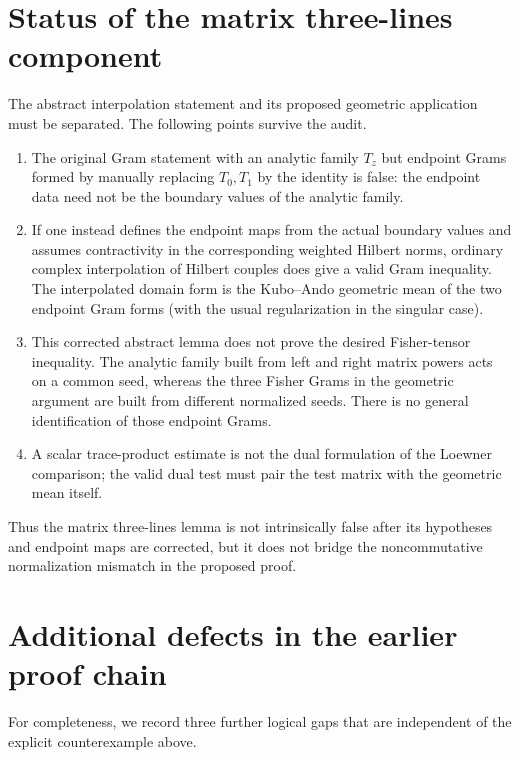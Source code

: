 \documentclass[11pt]{article}
\theoremstyle{definition}
\begin{document}
\section{Status of the matrix three-lines component}

The abstract interpolation statement and its proposed geometric application must be separated.
The following points survive the audit.

\begin{enumerate}[label=\textup{(\roman*)},leftmargin=2.1em]
\item The original Gram statement with an analytic family $T_z$ but endpoint Grams formed by
      manually replacing $T_0,T_1$ by the identity is false: the endpoint data need not be the
      boundary values of the analytic family.
\item If one instead defines the endpoint maps from the actual boundary values and assumes
      contractivity in the corresponding weighted Hilbert norms, ordinary complex interpolation
      of Hilbert couples does give a valid Gram inequality.  The interpolated domain form is the
      Kubo--Ando geometric mean of the two endpoint Gram forms (with the usual regularization in
      the singular case).
\item This corrected abstract lemma does not prove the desired Fisher-tensor inequality.  The
      analytic family built from left and right matrix powers acts on a common seed, whereas the
      three Fisher Grams in the geometric argument are built from different normalized seeds.
      There is no general identification of those endpoint Grams.
\item A scalar trace-product estimate is not the dual formulation of the Loewner comparison; the
      valid dual test must pair the test matrix with the geometric mean itself.
\end{enumerate}

Thus the matrix three-lines lemma is not intrinsically false after its hypotheses and endpoint maps
are corrected, but it does not bridge the noncommutative normalization mismatch in the proposed
proof.

\section{Additional defects in the earlier proof chain}

For completeness, we record three further logical gaps that are independent of the explicit
counterexample above.
\end{document}
